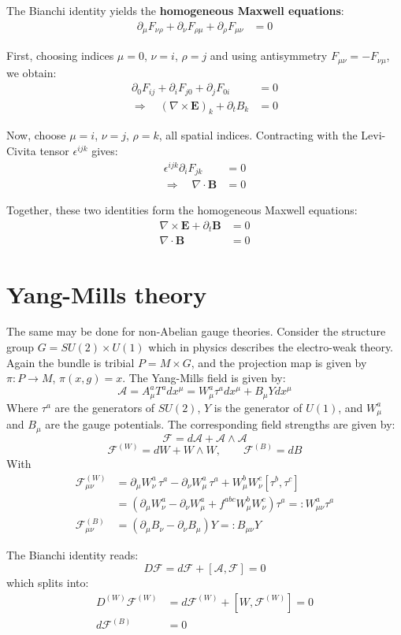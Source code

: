 The Bianchi identity yields the \textbf{homogeneous Maxwell equations}:
\begin{align*}
  \partial_\mu F_{\nu\rho} + \partial_\nu F_{\rho\mu} + \partial_\rho F_{\mu\nu} &= 0
\end{align*}

First, choosing indices \(\mu=0\), \(\nu=i\), \(\rho=j\) and using antisymmetry \(F_{\mu\nu} = -F_{\nu\mu}\), we obtain:
\begin{align*}
  \partial_0 F_{ij} + \partial_i F_{j0} + \partial_j F_{0i} &= 0 \\
  \Rightarrow \quad (\nabla \times \mathbf{E})_k + \partial_t B_k &= 0
\end{align*}

Now, choose \(\mu=i\), \(\nu=j\), \(\rho=k\), all spatial indices. Contracting with the Levi-Civita tensor \(\epsilon^{ijk}\) gives:
\begin{align*}
  \epsilon^{ijk} \partial_i F_{jk} &= 0 \\
  \Rightarrow \quad \nabla \cdot \mathbf{B} &= 0
\end{align*}

Together, these two identities form the homogeneous Maxwell equations:
\begin{align*}
  \nabla \times \mathbf{E} + \partial_t \mathbf{B} &= 0 \\
  \nabla \cdot \mathbf{B} &= 0
\end{align*}



\section{Yang-Mills theory}

The same may be done for non-Abelian gauge theories. Consider the structure group $G=SU(2)\times U(1)$ which in physics describes the electro-weak theory. Again the bundle is tribial $P = M \times G$, and the projection map is given by $\pi: P \to M$, $\pi(x,g) = x$. The Yang-Mills field is given by:
\[ \mathcal{A} = A_\mu^a T^a dx^\mu = W_\mu^a\tau^a dx^\mu + B_\mu Y dx^\mu \]
Where $\tau^a$ are the generators of $SU(2)$, $Y$ is the generator of $U(1)$, and $W_\mu^a$ and $B_\mu$ are the gauge potentials. The corresponding field strengths are given by:
\[ \mathscr{F} = d\mathcal{A} + \mathcal{A}\wedge\mathcal{A} \]
\[
\mathscr{F}^{(W)} = dW + W \wedge W, \qquad \mathscr{F}^{(B)} = dB
\]
With
\begin{align*}
  \mathscr{F}^{(W)}_{\mu\nu} 
  &= \partial_\mu W_\nu^a \, \tau^a - \partial_\nu W_\mu^a \, \tau^a + W_\mu^b W_\nu^c [\tau^b, \tau^c] \\[0.8em]
  &= \left( \partial_\mu W_\nu^a - \partial_\nu W_\mu^a + f^{abc} W_\mu^b W_\nu^c \right) \tau^a 
  =: W_{\mu\nu}^a \tau^a \\[1.2em]
  \mathscr{F}^{(B)}_{\mu\nu} 
  &= (\partial_\mu B_\nu - \partial_\nu B_\mu)Y =: B_{\mu\nu} Y
\end{align*}

The Bianchi identity reads:
\[
D \mathscr{F} = d\mathscr{F} + [\mathcal{A}, \mathscr{F}] = 0
\]
which splits into:
\begin{align*}
  D^{(W)} \mathscr{F}^{(W)} &= d\mathscr{F}^{(W)} + [W, \mathscr{F}^{(W)}] = 0 \\
  d\mathscr{F}^{(B)} &= 0
\end{align*}
